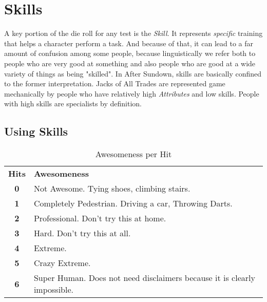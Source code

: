 \chapter{Skills}

A key portion of the die roll for any test is the \textit{Skill}. It represents \textit{specific} training that helps a character perform a task. And because of that, it can lead to a far amount of confusion among some people, because linguistically we refer both to people who are very good at something and also people who are good at a wide variety of things as being "skilled". In After Sundown, skills are basically confined to the former interpretation. Jacks of All Trades are represented game mechanically by people who have relatively high \textit{Attributes} and low skills. People with high skills are specialists by definition.

\section{Using Skills}

\begin{table}[htb]  \center \vspace{-1cm}
\caption[Awesomeness per Hit (Skills)]{Awesomeness per Hit}
\begin{tabular}{c l}
\textbf{Hits} & \textbf{Awesomeness} \\
\textbf{0} & Not Awesome. Tying shoes, climbing stairs.\\
\textbf{1} & Completely Pedestrian. Driving a car, Throwing Darts.\\
\textbf{2} & Professional. Don't try this at home.\\
\textbf{3} & Hard. Don't try this at all.\\
\textbf{4} & Extreme.\\
\textbf{5} & Crazy Extreme.\\
\textbf{6} & Super Human. Does not need disclaimers because it is clearly impossible. \\
\end{tabular}
\end{table}

